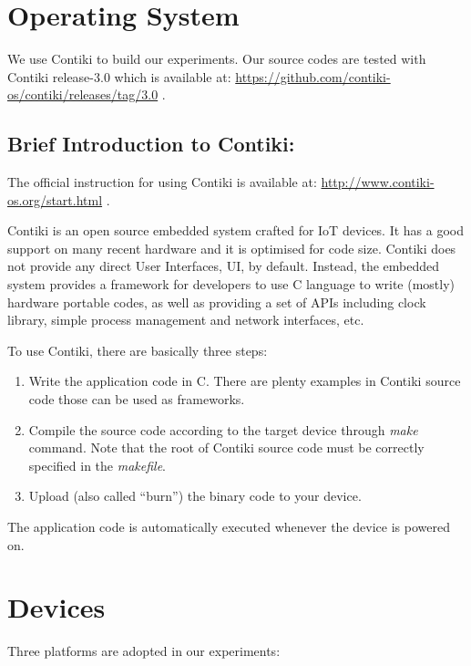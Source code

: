 \section{Operating System}

We use Contiki\cite{Contiki} to build our experiments.  Our source codes are tested with Contiki release-3.0 which is available at: \url{https://github.com/contiki-os/contiki/releases/tag/3.0} .

\subsection{Brief Introduction to Contiki:}

The official instruction for using Contiki is available at:	\url{http://www.contiki-os.org/start.html} .


Contiki is an open source embedded system crafted for IoT devices. It has a good support on many recent hardware and it is optimised for code size. Contiki does not provide any direct User Interfaces, UI, by default. Instead, the embedded system provides a framework for developers to use C language to write (mostly) hardware portable codes, as well as providing a set of APIs including clock library, simple process management and network interfaces, etc.

To use Contiki, there are basically three steps:

\begin{enumerate}
	\item Write the application code in C. There are plenty examples in Contiki source code those can be used as frameworks.
	\item Compile the source code according to the target device through \textit{make} command. Note that the root of Contiki source code must be correctly specified in the \textit{makefile}. 
	\item Upload (also called ``burn'') the binary code to your device. 
\end{enumerate}

The application code is automatically executed whenever the device is powered on.

\section{Devices}

Three platforms are adopted in our experiments:

